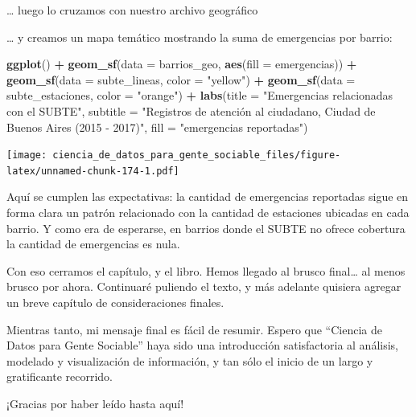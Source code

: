 \documentclass[spanish,]{book}
\newenvironment{Shaded}{\begin{snugshade}}{\end{snugshade}}
\newcommand{\DataTypeTok}[1]{\textcolor[rgb]{0.13,0.29,0.53}{#1}}
\newcommand{\KeywordTok}[1]{\textcolor[rgb]{0.13,0.29,0.53}{\textbf{#1}}}
\newcommand{\NormalTok}[1]{#1}
\newcommand{\OperatorTok}[1]{\textcolor[rgb]{0.81,0.36,0.00}{\textbf{#1}}}
\newcommand{\StringTok}[1]{\textcolor[rgb]{0.31,0.60,0.02}{#1}}
\begin{document}
\ldots{} luego lo cruzamos con nuestro archivo geográfico

\begin{Shaded}
\end{Shaded}

\ldots{} y creamos un mapa temático mostrando la suma de emergencias por barrio:

\begin{Shaded}
\begin{Highlighting}[]
\KeywordTok{ggplot}\NormalTok{() }\OperatorTok{+}
\StringTok{    }\KeywordTok{geom_sf}\NormalTok{(}\DataTypeTok{data =}\NormalTok{ barrios_geo, }\KeywordTok{aes}\NormalTok{(}\DataTypeTok{fill =}\NormalTok{ emergencias)) }\OperatorTok{+}
\StringTok{    }\KeywordTok{geom_sf}\NormalTok{(}\DataTypeTok{data =}\NormalTok{ subte_lineas, }\DataTypeTok{color =} \StringTok{"yellow"}\NormalTok{) }\OperatorTok{+}
\StringTok{    }\KeywordTok{geom_sf}\NormalTok{(}\DataTypeTok{data =}\NormalTok{ subte_estaciones, }\DataTypeTok{color =} \StringTok{"orange"}\NormalTok{) }\OperatorTok{+}
\StringTok{    }\KeywordTok{labs}\NormalTok{(}\DataTypeTok{title =} \StringTok{"Emergencias relacionadas con el SUBTE"}\NormalTok{,}
         \DataTypeTok{subtitle =} \StringTok{"Registros de atención al ciudadano, Ciudad de Buenos Aires (2015 - 2017)"}\NormalTok{,}
         \DataTypeTok{fill =} \StringTok{"emergencias reportadas"}\NormalTok{)}
\end{Highlighting}
\end{Shaded}

\texttt{[image: ciencia\_de\_datos\_para\_gente\_sociable\_files/figure-latex/unnamed-chunk-174-1.pdf]}

Aquí se cumplen las expectativas: la cantidad de emergencias reportadas sigue en forma clara un patrón relacionado con la cantidad de estaciones ubicadas en cada barrio. Y como era de esperarse, en barrios donde el SUBTE no ofrece cobertura la cantidad de emergencias es nula.

Con eso cerramos el capítulo, y el libro. Hemos llegado al brusco final\ldots{} al menos brusco por ahora. Continuaré puliendo el texto, y más adelante quisiera agregar un breve capítulo de consideraciones finales.

Mientras tanto, mi mensaje final es fácil de resumir. Espero que ``Ciencia de Datos para Gente Sociable'' haya sido una introducción satisfactoria al análisis, modelado y visualización de información, y tan sólo el inicio de un largo y gratificante recorrido.

¡Gracias por haber leído hasta aquí!


\end{document}
